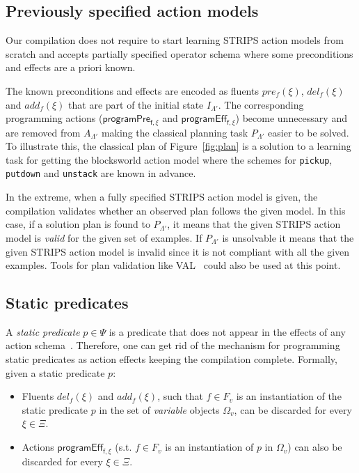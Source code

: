 \documentclass[letterpaper]{article} %
\begin{document}
\subsection{Previously specified action models}
Our compilation does not require to start learning STRIPS action models from scratch and accepts partially specified operator schema where some preconditions and effects are a priori known.

The known preconditions and effects are encoded as fluents $pre_f(\xi)$, $del_f(\xi)$ and $add_f(\xi)$ that are part of the initial state $I_{\Lambda'}$. The corresponding programming actions ($\mathsf{programPre_{f,\xi}}$ and $\mathsf{programEff_{f,\xi}}$) become unnecessary and are removed from $A_{\Lambda'}$ making the classical planning task $P_{\Lambda'}$ easier to be solved. To illustrate this, the classical plan of Figure~\ref{fig:plan} is a solution to a learning task for getting the blocksworld action model where the schemes for {\tt\small pickup}, {\tt\small putdown} and {\tt\small unstack} are known in advance.

In the extreme, when a fully specified STRIPS action model is given, the compilation validates whether an observed plan follows the given model. In this case, if a solution plan is found to $P_{\Lambda'}$, it means that the given STRIPS action model is {\em valid} for the given set of examples. If $P_{\Lambda'}$ is unsolvable it means that the given STRIPS action model is invalid since it is not compliant with all the given examples. Tools for plan validation like VAL~\cite{howey2004val} could also be used at this point.

\subsection{Static predicates}
A {\em static predicate} $p \in \Psi$ is a predicate that does not appear in the effects of any action schema~\cite{fox:TIM:JAIR1998}. Therefore, one can get rid of the mechanism for programming static predicates as action effects keeping the compilation complete. Formally, given a static predicate $p$:
\begin{itemize}
\item Fluents $del_f(\xi)$ and $add_f(\xi)$, such that $f\in F_v$ is an instantiation of the static predicate $p$ in the set of {\em variable} objects $\Omega_v$, can be discarded for every $\xi\in\Xi$.
\item Actions $\mathsf{programEff_{f,\xi}}$ (s.t. $f\in F_v$ is an instantiation of $p$ in $\Omega_v$) can also be discarded for every $\xi\in\Xi$.
\end{itemize}
\end{document}
